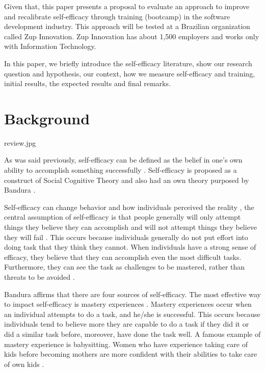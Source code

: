 \documentclass{TheMartianReport}
\begin{document}
Given that, this paper presents a proposal to evaluate an approach to improve and recalibrate self-efficacy through training (bootcamp) in the software development industry. This approach will be tested at a Brazilian organization called Zup Innovation. Zup Innovation has about 1,500 employers and works only with Information Technology. 

In this paper, we briefly introduce the self-efficacy literature, show our research question and hypothesis, our context, how we measure self-efficacy and training, initial results, the expected results and final remarks.



\section{Background}{review.jpg}

As was said previously, self-efficacy can be defined as the belief in one's own ability to accomplish something successfully  \cite{bandura1977self}. Self-efficacy is proposed as a construct of Social Cognitive Theory \cite{bandura1977social} and also had an own theory purposed by Bandura \cite{bandura1977self}. 

Self-efficacy can change behavior and how individuals perceived the reality \cite{bandura2010self}, the central assumption of self-efficacy is that people generally will only attempt things they believe they can accomplish and will not attempt things they believe they will fail \cite{bandura1977self}. This occurs because individuals generally do not put effort into doing task that they think they cannot. When individuals have a strong sense of efficacy, they believe that they can accomplish even the most difficult tasks. Furthermore, they can see the task as challenges to be mastered, rather than threats to be avoided \cite{bandura1994ramachaudran}.

Bandura affirms that there are four sources of self-efficacy. The most effective way to impact self-efficacy is mastery experiences \cite{bandura1994ramachaudran}. Mastery experiences occur when an individual attempts to do a task, and he/she is successful. This occurs because individuals tend to believe more they are capable to do a task if they did it or did a similar task before,  moreover, have done the task well. A famous example of mastery experience is babysitting. Women who have experience taking care of kids before becoming mothers are more confident with their abilities to take care of own kids \cite{froman1989infant}.
\end{document}
